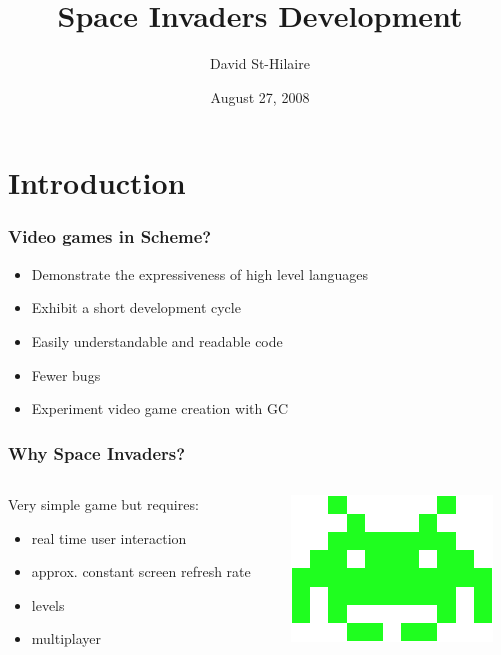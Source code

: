 \documentclass{beamer}
\title{Space Invaders Development}
\author{David St-Hilaire}
\date{August 27, 2008}
\newcommand{\<}[1]{\`#1}
\begin{document}
\begin{frame}
\titlepage
\end{frame}


\section{Introduction}

\begin{frame}
  \frametitle{Video games in Scheme?}
  \begin{itemize}
  \item Demonstrate the expressiveness of high level languages
  \item Exhibit a short development cycle
  \item Easily \alert{understandable} and \alert{readable} code
  \item Fewer bugs
  \item Experiment video game creation with GC
  \end{itemize}
\end{frame}

\begin{frame}
  \frametitle{Why Space Invaders?}

  \begin{columns}[c]
    \begin{column}{7cm} 
      Very simple game but requires:
      \begin{itemize}
      \item real time user interaction
      \item approx. constant screen refresh rate
      \item levels
      \item multiplayer
      \end{itemize}
    \end{column}
    \begin{column}{5cm} \includegraphics[scale=0.5]{medium} \end{column}
  \end{columns}
\end{frame}
\end{document}
